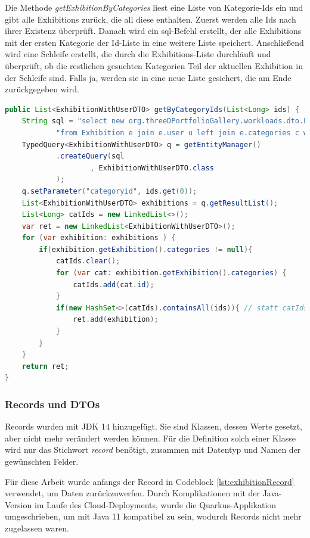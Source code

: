 Die Methode \emph{getExhibitionByCategories} liest eine Liste von Kategorie-Ids ein und gibt alle Exhibitions zurück, die all diese enthalten. 
Zuerst werden alle Ids nach ihrer Existenz überprüft. 
Danach wird ein \gls{sql}-Befehl erstellt, der alle Exhibitions mit der ersten Kategorie der Id-Liste in eine weitere Liste speichert. 
Anschließend wird eine Schleife erstellt, die durch die Exhibitions-Liste durchläuft und überprüft, ob die restlichen gesuchten Kategorien Teil der aktuellen Exhibition in der Schleife sind. 
Falls ja, werden sie in eine neue Liste gesichert, die am Ende zurückgegeben wird.

\begin{lstlisting}[label=lst:json:newExhibition, caption=Beispiel für neue Exhibition, language=Java]
public List<ExhibitionWithUserDTO> getByCategoryIds(List<Long> ids) {
    String sql = "select new org.threeDPortfolioGallery.workloads.dto.ExhibitionWithUserDTO(e, u.user_name, u.icon_url) " +
            "from Exhibition e join e.user u left join e.categories c where c.id in :categoryid";
    TypedQuery<ExhibitionWithUserDTO> q = getEntityManager()
            .createQuery(sql
                    , ExhibitionWithUserDTO.class
            );
    q.setParameter("categoryid", ids.get(0));
    List<ExhibitionWithUserDTO> exhibitions = q.getResultList();
    List<Long> catIds = new LinkedList<>();
    var ret = new LinkedList<ExhibitionWithUserDTO>();
    for (var exhibition: exhibitions ) {
        if(exhibition.getExhibition().categories != null){
            catIds.clear();
            for (var cat: exhibition.getExhibition().categories) {
                catIds.add(cat.id);
            }
            if(new HashSet<>(catIds).containsAll(ids)){ // statt catIds.containsAll(ids) wegen performance, ye
                ret.add(exhibition);
            }
        }
    }
    return ret;
}
\end{lstlisting}

\subsubsection{Records und DTOs}
Records wurden mit JDK 14 hinzugefügt. 
Sie sind Klassen, dessen Werte gesetzt, aber nicht mehr verändert werden können. 
Für die Definition solch einer Klasse wird nur das Stichwort \emph{record} benötigt, zusammen mit Datentyp und Namen der gewünschten Felder. \cite{recordAbout}

Für diese Arbeit wurde anfangs der Record in Codeblock \ref{lst:exhibitionRecord} verwendet, um Daten zurückzuwerfen. 
Durch Komplikationen mit der Java-Version im Laufe des Cloud-Deployments, wurde die Quarkus-Applikation umgeschrieben, um mit Java 11 kompatibel zu sein, wodurch Records nicht mehr zugelassen waren. 

